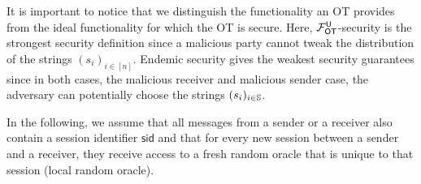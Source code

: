 \begin{remark}
It is important to notice that we distinguish the functionality an OT provides from the ideal functionality for which the OT is secure. Here, 
$\mathcal{F}_{\mathsf{OT}}^\mathsf{U}$-security is the strongest security definition since a malicious party cannot tweak the distribution of the strings  $(s_i)_{i\in[n]}$. Endemic security gives the weakest security guarantees since in both cases, the malicious receiver and malicious sender case, the adversary can potentially choose the strings $(s_i)_{i\in\mathsf{\mathbb S}}$.
\end{remark}

\begin{remark}
In the following, we assume that all messages from a sender or a receiver also contain a session identifier $\mathsf{sid}$ and that for every new session between a sender and a receiver, they receive access to a fresh random oracle that is unique to that session (local random oracle).  
\end{remark}

